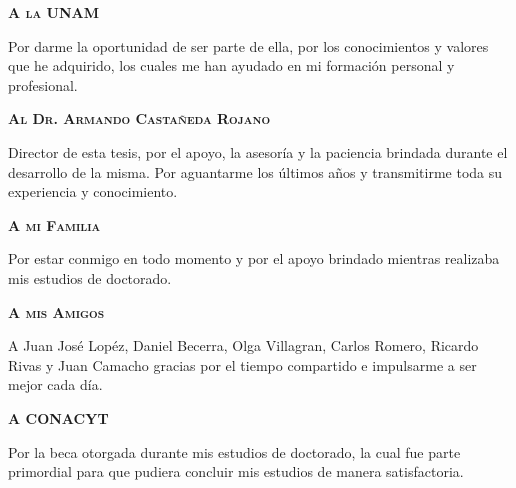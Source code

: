 \begin{agradecimientos}
  \textbf{\textsc{A la UNAM}}

  \vspace{1em}

  Por darme la oportunidad de ser parte de ella, por los conocimientos
  y valores que he adquirido, los cuales me han ayudado en mi
  formación personal y profesional.

  \vspace{1em}

  \textbf{\textsc{Al Dr. Armando Castañeda Rojano}}

  \vspace{1em}

  Director de esta tesis, por el apoyo, la asesoría y la paciencia
  brindada durante el desarrollo de la misma. Por aguantarme los
  últimos años y transmitirme toda su experiencia y conocimiento.

  \vspace{1em}

  \textbf{\textsc{A mi Familia}}

  \vspace{1em}

  Por estar conmigo en todo momento y por el apoyo brindado mientras
  realizaba mis estudios de doctorado.

  \vspace{1em}

  \textbf{\textsc{A mis Amigos}}

  \vspace{1em}

  A Juan José Lopéz, Daniel Becerra, Olga Villagran, Carlos Romero,
  Ricardo Rivas y Juan Camacho gracias por el tiempo compartido e
  impulsarme a ser mejor cada día.

  \vspace{1em}

  \textbf{\textsc{A CONACYT}}

  \vspace{1em}

  Por la beca otorgada durante mis estudios de doctorado, la cual fue
  parte primordial para que pudiera concluir mis estudios de manera
  satisfactoria.

\end{agradecimientos}